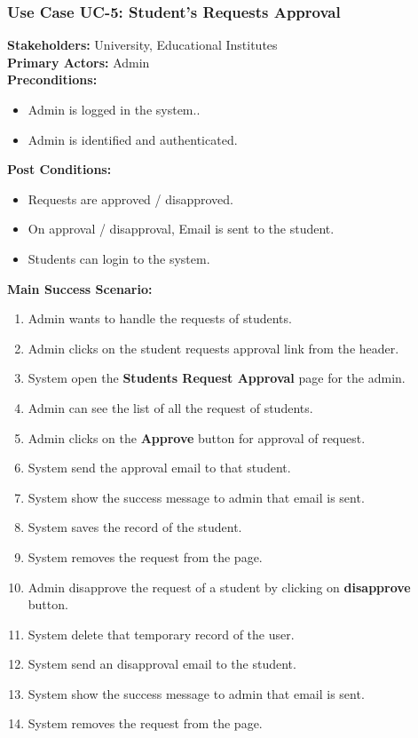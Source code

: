 \documentclass[12pt]{article}
\begin{document}
\subsubsection{Use Case UC-5: Student's Requests Approval}
\textbf{Stakeholders: } University, Educational Institutes \\
\textbf{Primary Actors: } Admin \\
\textbf{Preconditions:}
\begin{itemize}
\item Admin is logged in the system..
\item Admin is identified and authenticated.
\end{itemize}
\textbf{Post Conditions: }
\begin{itemize}
\item Requests are approved / disapproved.
\item On approval / disapproval, Email is sent to the student.
\item Students can login to the system.
\end{itemize}
\textbf{Main Success Scenario:}
\begin{enumerate}
\item Admin wants to handle the requests of students.
\item Admin clicks on the student requests approval link from the header.
\item System open the \textbf{Students Request Approval} page for the admin.
\item Admin can see the list of all the request of students.
\item Admin clicks on the \textbf{Approve} button for approval of request.
\item System send the approval email to that student.
\item System show the success message to admin that email is sent.
\item System saves the record of the student.
\item System removes the request from the page.
\item Admin disapprove the request of a student by clicking on \textbf{disapprove} button.
\item System delete that temporary record of the user.
\item System send an disapproval email to the student.
\item System show the success message to admin that email is sent.
\item System removes the request from the page.
\end{enumerate}
\end{document}
